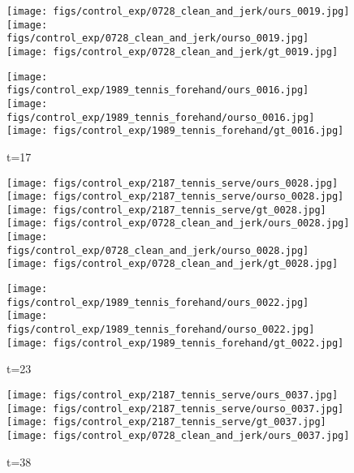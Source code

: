 \documentclass{article}
\begin{document}
\begin{appendix}
\begin{figure*}[!thbp]
\begin{subfigure}{0.12\linewidth}
  		\texttt{[image: figs/control\_exp/0728\_clean\_and\_jerk/ours\_0019.jpg]}
  		\texttt{[image: figs/control\_exp/0728\_clean\_and\_jerk/ourso\_0019.jpg]}
  		\vspace{.2cm}
  		\texttt{[image: figs/control\_exp/0728\_clean\_and\_jerk/gt\_0019.jpg]}
  		\caption*{t=17}
  		\vspace{-7pt}
  		\texttt{[image: figs/control\_exp/1989\_tennis\_forehand/ours\_0016.jpg]}
  		\texttt{[image: figs/control\_exp/1989\_tennis\_forehand/ourso\_0016.jpg]}
  		\vspace{.2cm}
  		\texttt{[image: figs/control\_exp/1989\_tennis\_forehand/gt\_0016.jpg]}
	\end{subfigure} 
    \begin{subfigure}{0.12\linewidth}
        \caption*{t=29}
        \vspace{-7pt}
	    \texttt{[image: figs/control\_exp/2187\_tennis\_serve/ours\_0028.jpg]}
	    \texttt{[image: figs/control\_exp/2187\_tennis\_serve/ourso\_0028.jpg]}
	    \vspace{.2cm}
  		\texttt{[image: figs/control\_exp/2187\_tennis\_serve/gt\_0028.jpg]}
  		\texttt{[image: figs/control\_exp/0728\_clean\_and\_jerk/ours\_0028.jpg]}
  		\texttt{[image: figs/control\_exp/0728\_clean\_and\_jerk/ourso\_0028.jpg]}
  		\vspace{.2cm}
  		\texttt{[image: figs/control\_exp/0728\_clean\_and\_jerk/gt\_0028.jpg]}
  		\caption*{t=23}
  		\vspace{-7pt}
  		\texttt{[image: figs/control\_exp/1989\_tennis\_forehand/ours\_0022.jpg]}
  		\texttt{[image: figs/control\_exp/1989\_tennis\_forehand/ourso\_0022.jpg]}
  		\vspace{.2cm}
  		\texttt{[image: figs/control\_exp/1989\_tennis\_forehand/gt\_0022.jpg]}
	\end{subfigure} 
    \begin{subfigure}{0.12\linewidth}
        \caption*{t=38}
        \vspace{-7pt}
	    \texttt{[image: figs/control\_exp/2187\_tennis\_serve/ours\_0037.jpg]}
	    \texttt{[image: figs/control\_exp/2187\_tennis\_serve/ourso\_0037.jpg]}
	    \vspace{.2cm}
  		\texttt{[image: figs/control\_exp/2187\_tennis\_serve/gt\_0037.jpg]}
  		\texttt{[image: figs/control\_exp/0728\_clean\_and\_jerk/ours\_0037.jpg]}

\end{subfigure}
\end{figure*}
\end{appendix}
\end{document}

